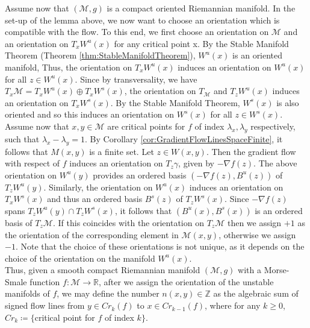 \documentclass[10pt]{article}
\theoremstyle{plain}
\theoremstyle{definition}
\newcommand{\Real}{\mathbb{R}}
\newcommand{\man}{\mathcal{M}}
\begin{document}
Assume now that $(\man,g)$ is a compact oriented Riemannian manifold. In the set-up of the lemma above, we now want to choose an orientation which is compatible with the flow. To this end, we first choose an orientation on $\man$ and an orientation on $T_xW^u(x)$ for any critical point x. By the Stable Manifold Theorem (Theorem \ref{thm:StableManifoldTheorem}), $W^u(x)$ is an oriented manifold, Thus, the orientation on $T_xW^u(x)$ induces an orientation on $W^u(x)$ for all $z\in W^u(x)$. Since by transversality, we have $T_x\man = T_x W^u(x) \oplus T_x W^s(x)$, the orientation on $T_\man$ and $T_zW^u(x)$ induces an orientation on $T_xW^s(x)$. By the Stable Manifold Theorem, $W^s(x)$ is also oriented and so this induces an orientation on $W^s(x)$ for all $z\in W^s(x)$.\\
Assume now that $x,y\in\man$ are critical points for $f$ of index $\lambda_x,\lambda_y$ respectively, such that $\lambda_x-\lambda_y = 1$. By Corollary \ref{cor:GradientFlowLinesSpaceFinite}, it follows that $M(x,y)$ is a finite set. Let $z\in W(x,y)$. Then the gradient flow with respect of $f$ induces an orientation on $T_z\gamma$, given by $-\nabla f(z).$ The above orientation on $W^u(y)$ provides an ordered basis $(-\nabla f(z), B^u(z))$ of $T_zW^u(y)$. Similarly, the orientation on $W^u(x)$ induces an orientation on $T_xW^s(x)$ and thus an ordered basis $B^s(z)$ of $T_zW^s(x)$. Since $-\nabla f(z)$ spans $T_zW^u(y) \cap T_zW^s(x)$, it follows that $(B^u(x),B^s(x))$ is an ordered basis of $T_z\man$. If this coincides with the orientation on $T_z\man$ then we assign $+1$ as the orientation of the corresponding element in $\man(x,y)$, otherwise we assign $-1$. Note that the choice of these orientations is not unique, as it depends on the choice of the orientation on the manifold $W^u(x)$.\\
Thus, given a smooth compact Riemannian manifold $(\man,g)$ with a Morse-Smale function $f:\man \to\Real$, after we assign the orientation of the unstable manifolds of $f$, we may define the number $n(x,y) \in \mathbb{Z}$ as the algebraic sum of signed flow lines from $y\in Cr_k(f)$ to $x\in Cr_{k-1}(f)$, where for any $k\geq 0$, $Cr_k \coloneqq \{$critical point for $f$ of index $k\}$.
\end{document}
